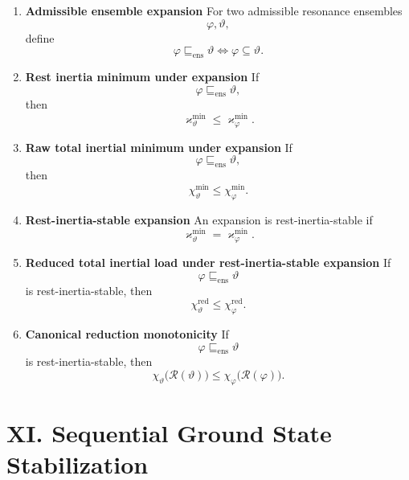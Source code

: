 \documentclass[11pt,letterpaper]{article}
\theoremstyle{plain}
\theoremstyle{definition}
\theoremstyle{remark}
\newcommand{\RestInertia}{\varkappa}
\newcommand{\TotInertia}{\chi}
\newcommand{\ResEns}{\varphi}
\newcommand{\ResEnsAlt}{\vartheta}
\newcommand{\GroundProj}{\mathscr{R}}
\begin{document}
\begin{enumerate}[resume]
\item \textbf{Admissible ensemble expansion}
For two admissible resonance ensembles
\[
\ResEns,\ResEnsAlt,
\]
define
\[
\ResEns\sqsubseteq_{\mathrm{ens}}\ResEnsAlt
\iff
\ResEns\subseteq\ResEnsAlt.
\]

\item \textbf{Rest inertia minimum under expansion}
If
\[
\ResEns\sqsubseteq_{\mathrm{ens}}\ResEnsAlt,
\]
then
\[
\RestInertia_{\ResEnsAlt}^{\min}\le \RestInertia_{\ResEns}^{\min}.
\]

\item \textbf{Raw total inertial minimum under expansion}
If
\[
\ResEns\sqsubseteq_{\mathrm{ens}}\ResEnsAlt,
\]
then
\[
\TotInertia_{\ResEnsAlt}^{\min}\le \TotInertia_{\ResEns}^{\min}.
\]

\item \textbf{Rest-inertia-stable expansion}
An expansion is rest-inertia-stable if
\[
\RestInertia_{\ResEnsAlt}^{\min}=\RestInertia_{\ResEns}^{\min}.
\]

\item \textbf{Reduced total inertial load under rest-inertia-stable expansion}
If
\[
\ResEns\sqsubseteq_{\mathrm{ens}}\ResEnsAlt
\]
is rest-inertia-stable, then
\[
\TotInertia_{\ResEnsAlt}^{\mathrm{red}}
\le
\TotInertia_{\ResEns}^{\mathrm{red}}.
\]

\item \textbf{Canonical reduction monotonicity}
If
\[
\ResEns\sqsubseteq_{\mathrm{ens}}\ResEnsAlt
\]
is rest-inertia-stable, then
\[
\TotInertia_{\ResEnsAlt}\big(\GroundProj(\ResEnsAlt)\big)
\le
\TotInertia_{\ResEns}\big(\GroundProj(\ResEns)\big).
\]
\end{enumerate}

\section*{XI. Sequential Ground State Stabilization}
\end{document}
